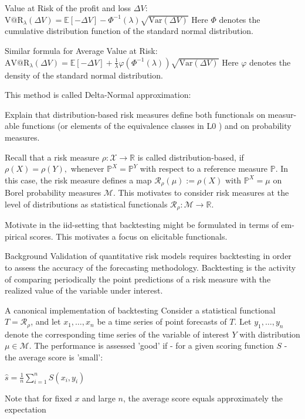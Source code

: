 Value at Risk of the profit and loss \(\Delta V\):
\(
\text{V@R}_\lambda(\Delta V) = \mathbb{E}[-\Delta V] - \Phi^{-1}(\lambda)\sqrt{\text{Var}(\Delta V)}
\)
Here \(\Phi\) denotes the cumulative distribution function of the standard normal distribution.

Similar formula for Average Value at Risk:
\(
\text{AV@R}_\lambda(\Delta V) = \mathbb{E}[-\Delta V] + \frac{1}{\lambda}\varphi(\Phi^{-1}(\lambda))\sqrt{\text{Var}(\Delta V)}
\)
Here \(\varphi\) denotes the density of the standard normal distribution.

This method is called Delta-Normal approximation:


Explain that distribution-based risk measures define both functionals on measur-
able functions (or elements of the equivalence classes in L0 ) and on probability
measures.

Recall that a risk measure \(\rho : \mathcal{X} \to \mathbb{R}\) is called distribution-based, if
\(
\rho(X) = \rho(Y),
\)
whenever \(\mathbb{P}^X = \mathbb{P}^Y\) with respect to a reference measure \(\mathbb{P}\).
In this case, the risk measure defines a map
\(
\mathcal{R}_{\rho}(\mu) := \rho(X) \text{ with } \mathbb{P}^X = \mu
\)
on Borel probability measures \(\mathcal{M}\).
This motivates to consider risk measures at the level of distributions as statistical functionals 
\(\mathcal{R}_{\rho} : \mathcal{M} \to \mathbb{R}\).


Motivate in the iid-setting that backtesting might be formulated in terms of em-
pirical scores. This motivates a focus on elicitable functionals.


Background
Validation of quantitative risk models requires backtesting in order to assess the accuracy of the forecasting methodology.
Backtesting is the activity of comparing periodically the point predictions of a risk measure with the realized value of the variable under interest.

A canonical implementation of backtesting
Consider a statistical functional \( T = \mathcal{R}_{\rho} \), and let \( x_1, \ldots, x_n \) be a time series of point forecasts of \( T \).
Let \( y_1, \ldots, y_n \) denote the corresponding time series of the variable of interest \( Y \) with distribution \( \mu \in \mathcal{M} \).
The performance is assessed 'good' if - for a given scoring function \( S \) - the average score is 'small':

\(
\hat{s} = \frac{1}{n} \sum_{i=1}^{n} S(x_i, y_i)
\)

Note that for fixed \( x \) and large \( n \), the average score equals approximately the expectation

